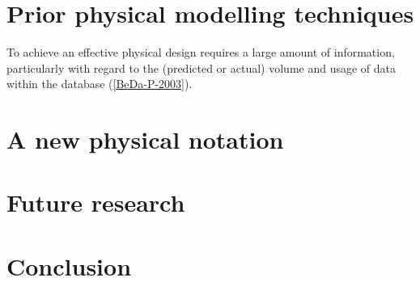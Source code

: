 \documentclass{llncs}
\begin{document}
\section{Prior physical modelling techniques}

To achieve an effective physical design requires a large amount of information, particularly with regard to the (predicted or actual) volume and usage of data within the database (\ref{BeDa-P-2003}).


\section{A new physical notation}


\section{Future research}


\section{Conclusion}
\end{document}
